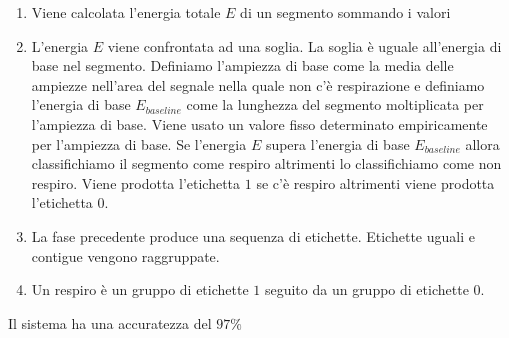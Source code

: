 \begin{frame}
\begin{enumerate}
      \item
	Viene calcolata l'energia totale $E$ di un segmento sommando i valori
      \item
	L'energia $E$ viene confrontata ad una soglia. 
	La soglia \`e uguale all'energia di base  nel segmento. 
	Definiamo l'ampiezza di base come la media delle ampiezze nell'area del segnale nella quale non c'\`e respirazione e definiamo l'energia di base $E_{baseline}$ come la lunghezza del segmento moltiplicata per l'ampiezza di base. 
	Viene usato un valore fisso determinato empiricamente per l'ampiezza di base. 
	Se l'energia $E$ supera l'energia di base $E_{baseline}$ allora classifichiamo il segmento come respiro altrimenti lo classifichiamo come non respiro. 
	Viene prodotta l'etichetta $1$ se c'\`e respiro altrimenti viene prodotta l'etichetta $0$.
      \item
	La fase precedente produce una sequenza di etichette. 
	Etichette uguali e contigue vengono raggruppate.
      \item
	Un respiro \`e un gruppo di etichette $1$ seguito da un gruppo di etichette $0$.
    \end{enumerate}

    Il sistema ha una accuratezza del $97\%$





\end{frame}
